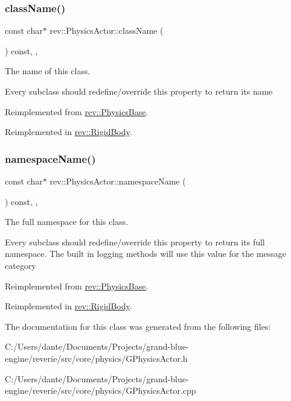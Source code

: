 \subsubsection{\texorpdfstring{className()}{className()}}
{\footnotesize\ttfamily const char$\ast$ rev\+::\+Physics\+Actor\+::class\+Name (\begin{DoxyParamCaption}{ }\end{DoxyParamCaption}) const\hspace{0.3cm}{\ttfamily [inline]}, {\ttfamily [override]}, {\ttfamily [virtual]}}



The name of this class. 

Every subclass should redefine/override this property to return its name 

Reimplemented from \mbox{\hyperlink{classrev_1_1_physics_base_ad997bc1504ff6dccccbc3d8d0ea6e6a5}{rev\+::\+Physics\+Base}}.



Reimplemented in \mbox{\hyperlink{classrev_1_1_rigid_body_a996230070162f743c3e87f5c20fd981e}{rev\+::\+Rigid\+Body}}.

\mbox{\label{classrev_1_1_physics_actor_ad212df8d7d61f9b855bc9d9ede2b437f}} 
\subsubsection{\texorpdfstring{namespaceName()}{namespaceName()}}
{\footnotesize\ttfamily const char$\ast$ rev\+::\+Physics\+Actor\+::namespace\+Name (\begin{DoxyParamCaption}{ }\end{DoxyParamCaption}) const\hspace{0.3cm}{\ttfamily [inline]}, {\ttfamily [override]}, {\ttfamily [virtual]}}



The full namespace for this class. 

Every subclass should redefine/override this property to return its full namespace. The built in logging methods will use this value for the message category 

Reimplemented from \mbox{\hyperlink{classrev_1_1_physics_base_acf58cc81cff2ca957dcc68fe9a9a84a1}{rev\+::\+Physics\+Base}}.



Reimplemented in \mbox{\hyperlink{classrev_1_1_rigid_body_ae8e178b51dbe0e61ad0674e039864a92}{rev\+::\+Rigid\+Body}}.



The documentation for this class was generated from the following files\+:\begin{DoxyCompactItemize}
\item 
C\+:/\+Users/dante/\+Documents/\+Projects/grand-\/blue-\/engine/reverie/src/core/physics/G\+Physics\+Actor.\+h\item 
C\+:/\+Users/dante/\+Documents/\+Projects/grand-\/blue-\/engine/reverie/src/core/physics/G\+Physics\+Actor.\+cpp\end{DoxyCompactItemize}
